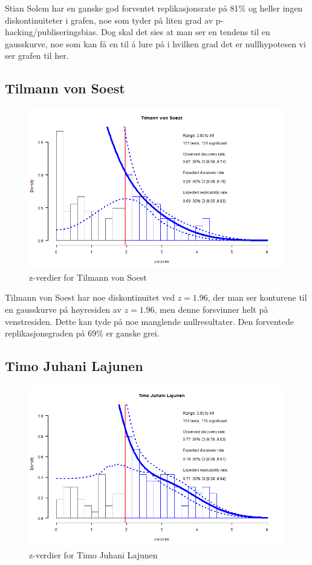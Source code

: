 \documentclass[doc,norsk]{apa7}
\begin{document}
Stian Solem har en ganske god forventet replikasjonsrate på 81\% og heller ingen diskontinuiteter i grafen, noe som tyder på liten grad av p-hacking/publiseringsbias. Dog skal det sies at man ser en tendens til en gausskurve, noe som kan få en til å lure på i hvilken grad det er nullhypotesen vi ser grafen til her.

\subsection{Tilmann von Soest}
\begin{figure}[h!]
    \centering
    \includegraphics[width=\textwidth]{images/Tilmann von Soest.png}
    \caption{z-verdier for Tilmann von Soest}
\end{figure}

Tilmann von Soest har noe diskontinuitet ved $z=1.96$, der man ser konturene til en gausskurve på høyresiden av $z=1.96$, men denne forsvinner helt på venstresiden. Dette kan tyde på noe manglende nullresultater. Den forventede replikasjonsgraden på 69\% er ganske grei.

\subsection{Timo Juhani Lajunen}
\begin{figure}[h!]
    \centering
    \includegraphics[width=\textwidth]{images/Timo Juhani Lajunen.png}
    \caption{z-verdier for Timo Juhani Lajunen}
\end{figure}
\end{document}
